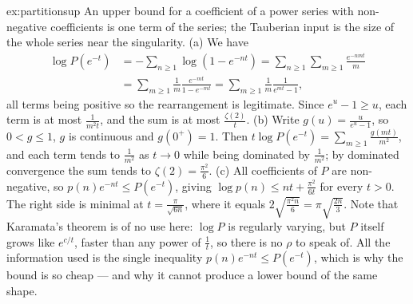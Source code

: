 \begin{solution}{ex:partitionsup}
\idea An upper bound for a coefficient of a power series with non-negative coefficients is one term of the series; the Tauberian input is the size of the
whole series near the singularity.
\writeup (a) We have
\[
\begin{aligned}
\log P(e^{-t})&=-\sum_{n\ge1}\log(1-e^{-nt})=\sum_{n\ge1}\sum_{m\ge1}\frac{e^{-nmt}}m\\
&=\sum_{m\ge1}\frac1m\frac{e^{-mt}}{1-e^{-mt}}=\sum_{m\ge1}\frac1m\frac1{e^{mt}-1},
\end{aligned}
\]
all terms being
positive so the rearrangement is legitimate. Since $e^u-1\ge u$, each term is at most $\frac1{m^2t}$, and the sum is at most $\frac{\zeta(2)}t$. (b) Write
$g(u)=\frac u{e^u-1}$, so $0<g\le1$, $g$ is continuous and $g(0^+)=1$. Then $t\log P(e^{-t})=\sum_{m\ge1}\frac{g(mt)}{m^2}$, and each term tends to $\frac1{m^2}$ as
$t\to0$ while being dominated by $\frac1{m^2}$; by dominated convergence the sum tends to $\zeta(2)=\frac{\pi^2}6$. (c) All coefficients of $P$ are
non-negative, so $p(n)e^{-nt}\le P(e^{-t})$, giving $\log p(n)\le nt+\frac{\pi^2}{6t}$ for every $t>0$. The right side is minimal at
$t=\frac\pi{\sqrt{6n}}$, where it equals $2\sqrt{\frac{\pi^2n}6}=\pi\sqrt{\frac{2n}3}$. Note that Karamata's theorem is of no use here: $\log P$ is
regularly varying, but $P$ itself grows like $e^{c/t}$, faster than any power of $\frac1t$, so there is no $\rho$ to speak of. All the information used is
the single inequality $p(n)e^{-nt}\le P(e^{-t})$, which is why the bound is so cheap --- and why it cannot produce a lower bound of the same shape.
\end{solution}

